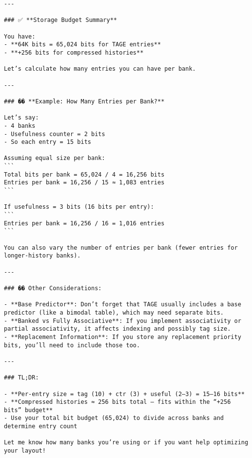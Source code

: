 \documentclass[11pt]{article}
\begin{document}
\begin{Verbatim}[fontsize=\tiny, breaklines=true]
---

### ✅ **Storage Budget Summary**

You have:
- **64K bits = 65,024 bits for TAGE entries**
- **+256 bits for compressed histories**

Let’s calculate how many entries you can have per bank.

---

### �� **Example: How Many Entries per Bank?**

Let’s say:
- 4 banks
- Usefulness counter = 2 bits
- So each entry = 15 bits

Assuming equal size per bank:
```
Total bits per bank = 65,024 / 4 = 16,256 bits
Entries per bank = 16,256 / 15 ≈ 1,083 entries
```

If usefulness = 3 bits (16 bits per entry):
```
Entries per bank = 16,256 / 16 = 1,016 entries
```

You can also vary the number of entries per bank (fewer entries for longer-history banks).

---

### ��️ Other Considerations:

- **Base Predictor**: Don’t forget that TAGE usually includes a base predictor (like a bimodal table), which may need separate bits.
- **Banked vs Fully Associative**: If you implement associativity or partial associativity, it affects indexing and possibly tag size.
- **Replacement Information**: If you store any replacement priority bits, you’ll need to include those too.

---

### TL;DR:

- **Per-entry size = tag (10) + ctr (3) + useful (2–3) = 15–16 bits**
- **Compressed histories ≈ 256 bits total — fits within the “+256 bits” budget**
- Use your total bit budget (65,024) to divide across banks and determine entry count

Let me know how many banks you’re using or if you want help optimizing your layout!
\end{Verbatim}
\end{document}
